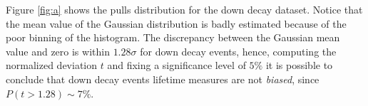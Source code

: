 Figure \ref{fig:a} shows the pulls distribution for the down decay dataset. Notice that the mean value of the Gaussian distribution is badly estimated because of the poor binning of the histogram. The discrepancy between the Gaussian mean value and zero is within $1.28 \sigma$ for down decay events, hence, computing the normalized deviation $t$ and fixing a significance level of $5 \%$ it is possible to conclude that down decay events lifetime measures are not \emph{biased}, since $P(t > 1.28) \sim 7\%$.

